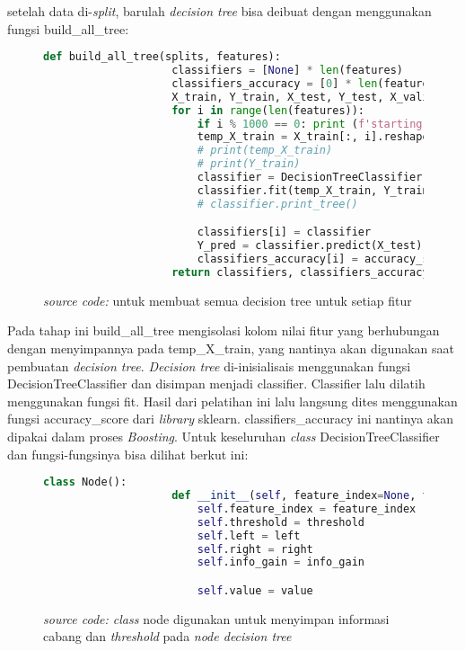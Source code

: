 		setelah data di-\textit{split}, barulah \emph{decision tree} bisa deibuat dengan menggunakan 
		fungsi build\_all\_tree:

		\begin{figure}[H]
			\begin{lstlisting}[language=Python, basicstyle=\tiny]
				def build_all_tree(splits, features):
					classifiers = [None] * len(features)
					classifiers_accuracy = [0] * len(features)
					X_train, Y_train, X_test, Y_test, X_valid, Y_valid = splits
					for i in range(len(features)):
						if i % 1000 == 0: print (f'starting tree {i}')
						temp_X_train = X_train[:, i].reshape(-1, 1)
						# print(temp_X_train)
						# print(Y_train)
						classifier = DecisionTreeClassifier(min_samples_split=3, max_depth=3)
						classifier.fit(temp_X_train, Y_train)
						# classifier.print_tree()

						classifiers[i] = classifier
						Y_pred = classifier.predict(X_test)
						classifiers_accuracy[i] = accuracy_score(Y_test, Y_pred)
					return classifiers, classifiers_accuracy
			\end{lstlisting}
			\caption{\emph{source code:} untuk membuat semua decision tree untuk setiap fitur}
			\label{code: make all decision tree}
		\end{figure}

		Pada tahap ini build\_all\_tree mengisolasi kolom nilai fitur yang berhubungan 
		dengan menyimpannya pada temp\_X\_train, yang nantinya akan digunakan saat pembuatan 
		\emph{decision tree}. \emph{Decision tree} di-inisialisais menggunakan fungsi
		DecisionTreeClassifier dan disimpan menjadi classifier. 
		Classifier lalu dilatih menggunakan fungsi fit. Hasil dari pelatihan ini lalu langsung dites menggunakan 
		fungsi accuracy\_score dari \textit{library} sklearn. classifiers\_accuracy ini nantinya 
		akan dipakai dalam proses \emph{Boosting}. Untuk keseluruhan \textit{class} DecisionTreeClassifier 
		dan fungsi-fungsinya bisa dilihat berkut ini:

		\begin{figure}[H]
			\begin{lstlisting}[language=Python, basicstyle=\tiny]
				class Node():
					def __init__(self, feature_index=None, threshold=None, left=None, right=None, info_gain=None, value=None):
						self.feature_index = feature_index
						self.threshold = threshold
						self.left = left
						self.right = right
						self.info_gain = info_gain

						self.value = value
			\end{lstlisting}
			\caption{\emph{source code: class} node digunakan untuk menyimpan informasi cabang dan
			\textit{threshold} pada \emph{node decision tree}}
			\label{code: node class}
		\end{figure}	

